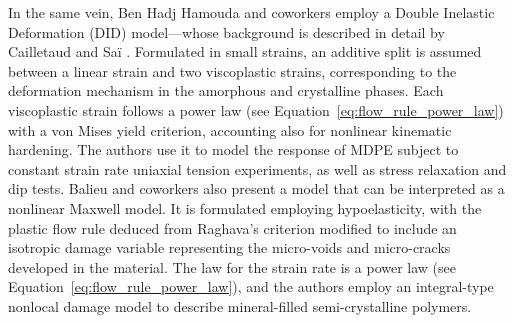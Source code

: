 In the same vein, Ben Hadj Hamouda and coworkers \citep{benhadjhamoudaViscoplasticBehaviourMedium2007} employ a Double Inelastic Deformation (DID) model---whose background is described in detail by Cailletaud and Saï \citep{cailletaudStudyPlasticViscoplastic1995}.
Formulated in small strains, an additive split is assumed between a linear strain and two viscoplastic strains, corresponding to the deformation mechanism in the amorphous and crystalline phases.
Each viscoplastic strain follows a power law (see Equation~\eqref{eq:flow_rule_power_law}) with a von Mises yield criterion, accounting also for nonlinear kinematic hardening.
The authors use it to model the response of MDPE subject to constant strain rate uniaxial tension experiments, as well as stress relaxation and dip tests.
Balieu and coworkers \citep{balieuNonassociatedViscoplasticityCoupled2014} also present a model that can be interpreted as a nonlinear Maxwell model.
It is formulated employing hypoelasticity, with the plastic flow rule deduced from Raghava's criterion modified to include an isotropic damage variable representing the micro-voids and micro-cracks developed in the material.
The law for the strain rate is a power law (see Equation~\eqref{eq:flow_rule_power_law}), and the authors employ an integral-type nonlocal damage model to describe mineral-filled semi-crystalline polymers.

